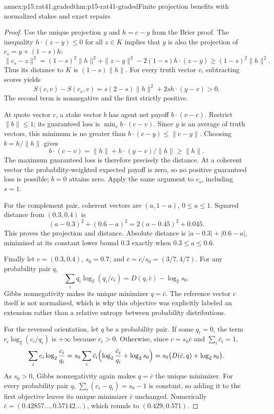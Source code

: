\begin{annexitem}{annex:p15.rat41.graded}{thm:p15-rat41-graded}{Finite projection benefits with normalized stakes and exact repairs}
\begin{proof}
Use the unique projection \(y\) and \(h=c-y\) from the Brier proof.
The inequality \(h\cdot(z-y)\leq0\) for all \(z\in K\) implies
that \(y\) is also the projection of \(c_s=y+(1-s)h\):
\[
 \|c_s-z\|^2
 =(1-s)^2\|h\|^2+\|z-y\|^2-2(1-s)h\cdot(z-y)
 \geq(1-s)^2\|h\|^2.
\]
Thus its distance to \(K\) is \((1-s)\|h\|\). For every truth
vector \(v\), subtracting scores yields
\[
 S(c,v)-S(c_s,v)
   =s(2-s)\|h\|^2+2s h\cdot(y-v)>0.
\]
The second term is nonnegative and the first strictly positive.

At quote vector \(c\), a stake vector \(b\) has agent net payoff
\(b\cdot(v-c)\). Restrict \(\|b\|\leq1\); its guaranteed loss
is \(\min_v b\cdot(c-v)\). Since \(y\) is an average of truth
vectors, this minimum is no greater than
\(b\cdot(c-y)\leq\|c-y\|\). Choosing \(b=h/\|h\|\) gives
\[
 b\cdot(c-v)=\|h\|+h\cdot(y-v)/\|h\|\geq\|h\|.
\]
The maximum guaranteed loss is therefore precisely the distance.
At a coherent vector the probability-weighted expected payoff is
zero, so no positive guaranteed loss is possible; \(b=0\) attains
zero. Apply the same argument to \(c_s\), including \(s=1\).

For the complement pair, coherent vectors are \((a,1-a)\),
\(0\leq a\leq1\). Squared distance from \((0.3,0.4)\) is
\[
       (a-0.3)^2+(0.6-a)^2=2(a-0.45)^2+0.045.
\]
This proves the projection and distance. Absolute distance is
\(|a-0.3|+|0.6-a|\), minimized at its constant lower bound
\(0.3\) exactly when \(0.3\leq a\leq0.6\).

Finally let \(c=(0.3,0.4)\), \(s_0=0.7\), and
\(\bar c=c/s_0=(3/7,4/7)\). For any probability pair \(q\),
\[
 \sum_i q_i\log_2(q_i/c_i)=D(q,\bar c)-\log_2s_0.
\]
Gibbs nonnegativity makes its unique minimizer \(q=\bar c\).
The reference vector \(c\) itself is not normalized, which is why
this objective was explicitly labeled an extension rather than a
relative entropy between probability distributions.

For the reversed orientation, let \(q\) be a probability pair. If some
\(q_i=0\), the term \(c_i\log_2(c_i/q_i)\) is \(+\infty\) because
\(c_i>0\). Otherwise, since \(c=s_0\bar c\) and \(\sum_i\bar c_i=1\),
\[
 \sum_i c_i\log_2\frac{c_i}{q_i}
   =s_0\sum_i\bar c_i\Bigl(\log_2\frac{\bar c_i}{q_i}+\log_2s_0\Bigr)
   =s_0\bigl(D(\bar c,q)+\log_2s_0\bigr).
\]
As \(s_0>0\), Gibbs nonnegativity again makes \(q=\bar c\) the unique
minimizer. For every probability pair \(q\),
\(\sum_i(c_i-q_i)=s_0-1\) is constant, so adding it to the first
objective leaves its unique minimizer \(\bar c\) unchanged. Numerically
\(\bar c=(0.42857\ldots,0.57142\ldots)\), which rounds to
\((0.429,0.571)\).
\end{proof}
\end{annexitem}
